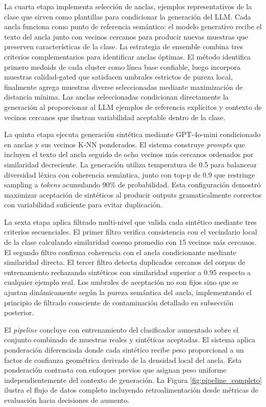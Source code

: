 La cuarta etapa implementa selección de anclas, ejemplos representativos de la clase que sirven como plantillas para condicionar la generación del LLM. Cada ancla funciona como punto de referencia semántico: el modelo generativo recibe el texto del ancla junto con vecinos cercanos para producir nuevas muestras que preserven características de la clase. La estrategia de ensemble combina tres criterios complementarios para identificar anclas óptimas. El método identifica primero medoids de cada cluster como línea base confiable, luego incorpora muestras calidad-gated que satisfacen umbrales estrictos de pureza local, finalmente agrega muestras diverse seleccionadas mediante maximización de distancia mínima. Las anclas seleccionadas condicionan directamente la generación al proporcionar al LLM ejemplos de referencia explícitos y contexto de vecinos cercanos que ilustran variabilidad aceptable dentro de la clase.

La quinta etapa ejecuta generación sintética mediante GPT-4o-mini condicionado en anclas y sus vecinos K-NN ponderados. El sistema construye \textit{prompts} que incluyen el texto del ancla seguido de ocho vecinos más cercanos ordenados por similaridad decreciente. La generación utiliza temperatura de 0.5 para balancear diversidad léxica con coherencia semántica, junto con top-p de 0.9 que restringe sampling a \textit{tokens} acumulando 90\% de probabilidad. Esta configuración demostró maximizar aceptación de sintéticos al producir outputs gramaticalmente correctos con variabilidad suficiente para evitar duplicación.

La sexta etapa aplica filtrado multi-nivel que valida cada sintético mediante tres criterios secuenciales. El primer filtro verifica consistencia con el vecindario local de la clase calculando similaridad coseno promedio con 15 vecinos más cercanos. El segundo filtro confirma coherencia con el ancla condicionante mediante similaridad directa. El tercer filtro detecta duplicados cercanos del corpus de entrenamiento rechazando sintéticos con similaridad superior a 0.95 respecto a cualquier ejemplo real. Los umbrales de aceptación no son fijos sino que se ajustan dinámicamente según la pureza semántica del ancla, implementando el principio de filtrado consciente de contaminación detallado en subsección posterior.

El \textit{pipeline} concluye con entrenamiento del clasificador aumentado sobre el conjunto combinado de muestras reales y sintéticas aceptadas. El sistema aplica ponderación diferenciada donde cada sintético recibe peso proporcional a un factor de confianza geométrica derivado de la densidad local del ancla. Esta ponderación contrasta con enfoques previos que asignan peso uniforme independientemente del contexto de generación. La Figura \ref{fig:pipeline_completo} ilustra el flujo de datos completo incluyendo retroalimentación desde métricas de evaluación hacia decisiones de aumento.

